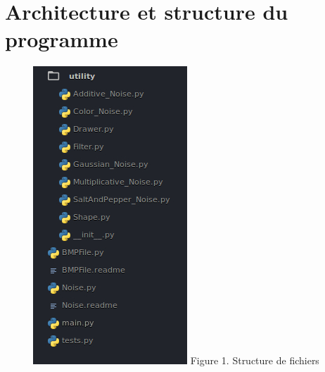 \documentclass{article}
\begin{document}
		
		\section{Architecture et structure du programme}
		
			\begin{figure}[!ht]
				\centering
				\begin{minipage}[t]{8cm}
					\centering
					\includegraphics{st3/File_Architecture.jpg}
					Figure 1. Structure de fichiers
				\end{minipage}
			\end{figure}
\end{document}
